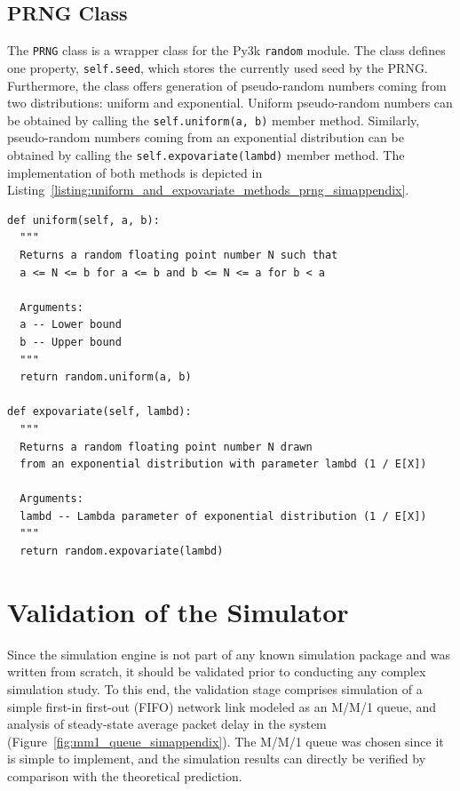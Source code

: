 \subsection{PRNG Class}
\label{sub:prng_class_simappendix}
The \lstinline{PRNG} class is a wrapper class for the Py3k \lstinline{random} module. The class defines one property, \lstinline{self.seed}, which stores the currently used seed by the PRNG. Furthermore, the class offers generation of pseudo-random numbers coming from two distributions: uniform and exponential. Uniform pseudo-random numbers can be obtained by calling the \lstinline{self.uniform(a, b)} member method. Similarly, pseudo-random numbers coming from an exponential distribution can be obtained by calling the \lstinline{self.expovariate(lambd)} member method. The implementation of both methods is depicted in Listing~\ref{listing:uniform_and_expovariate_methods_prng_simappendix}.
\begin{lstlisting}[caption=\lstinline{self.uniform(a, b)} and \lstinline{self.expovariate(lambd)} member methods of the \lstinline{PRNG} class, label=listing:uniform_and_expovariate_methods_prng_simappendix]
def uniform(self, a, b):
  """
  Returns a random floating point number N such that
  a <= N <= b for a <= b and b <= N <= a for b < a
  
  Arguments:
  a -- Lower bound
  b -- Upper bound
  """
  return random.uniform(a, b)

def expovariate(self, lambd):
  """
  Returns a random floating point number N drawn
  from an exponential distribution with parameter lambd (1 / E[X])
  
  Arguments:
  lambd -- Lambda parameter of exponential distribution (1 / E[X])
  """
  return random.expovariate(lambd)
\end{lstlisting}

\section{Validation of the Simulator}
\label{sec:validation_of_the_simulator_simappendix}
Since the simulation engine is not part of any known simulation package and was written from scratch, it should be validated prior to conducting any complex simulation study. To this end, the validation stage comprises simulation of a simple first-in first-out (FIFO) network link modeled as an M/M/1 queue, and analysis of steady-state average packet delay in the system (Figure~\ref{fig:mm1_queue_simappendix}). The M/M/1 queue was chosen since it is simple to implement, and the simulation results can directly be verified by comparison with the theoretical prediction.

